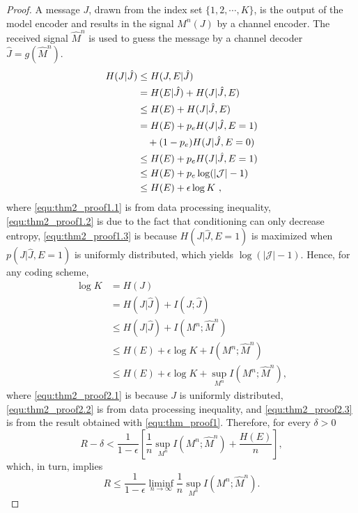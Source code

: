 \documentclass[lettersize,journal]{IEEEtran}
\theoremstyle{definition}
\theoremstyle{plain}
\begin{document}
\begin{proof}
    A message $J$, drawn from the index set $\{1,2,\cdots, K\}$, is the output of the model encoder and results in the signal $M^n(J)$ by a channel encoder. The received signal $\hat{M}^n$ is used to guess the message by a channel decoder $\hat{J}=g(\hat{M}^n)$.
    \begin{subequations}
        \label{equ:thm_proof1}
        \begin{align}
            H(J|\hat{J}) & \leq H(J, E | \hat{J}) \label{equ:thm2_proof1.1} \\
            & = H(E|\hat{J}) + H(J|\hat{J}, E) \\
            & \leq H(E) + H(J|\hat{J}, E) \label{equ:thm2_proof1.2} \\
            & = H(E) + p_eH(J|\hat{J}, E=1) \\
            & \notag \quad + (1-p_e)H(J|\hat{J}, E=0) \\
            & \leq H(E) + p_eH(J|\hat{J}, E=1) \\
            & \leq H(E) + p_e\log(|\mathcal{J}|-1) \label{equ:thm2_proof1.3} \\
            & \leq H(E) + \epsilon \log K\ ,
        \end{align}
    \end{subequations}
    where \cref{equ:thm2_proof1.1} is from data processing inequality, \cref{equ:thm2_proof1.2} is due to the fact that conditioning can only decrease entropy, \cref{equ:thm2_proof1.3} is because $H(J|\hat{J},E=1)$ is maximized when $p(J|\hat{J},E=1)$ is uniformly distributed, which yields $\log(\left|\mathcal{J}\right|-1)$. 
    Hence, for any coding scheme,
    \begin{subequations}
        \begin{align}
            \log K & = H(J) \label{equ:thm2_proof2.1} \\
            & = H(J|\hat{J}) + I(J;\hat{J}) \\
            & \leq H(J|\hat{J}) + I(M^n;\hat{M}^n) \label{equ:thm2_proof2.2} \\
            & \leq H(E) + \epsilon\log K + I(M^n;\hat{M}^n) \label{equ:thm2_proof2.3} \\
            & \leq H(E) + \epsilon\log K + \sup_{M^n}I(M^n;\hat{M}^n) \label{equ:thm2_proof2.4},
        \end{align}
    \end{subequations}
    where \cref{equ:thm2_proof2.1} is because $J$ is uniformly distributed, \cref{equ:thm2_proof2.2} is from data processing inequality, and \cref{equ:thm2_proof2.3} is from the result obtained with \cref{equ:thm_proof1}. 
    Therefore, for every $\delta>0$
    \begin{equation}
        R-\delta < \frac{1}{1-\epsilon}\left[\frac{1}{n}\sup_{M^n}I(M^n;\hat{M}^n) + \frac{H(E)}{n}\right],
    \end{equation}
    which, in turn, implies
    \begin{equation}
        R\leq \frac{1}{1-\epsilon} \liminf_{n\to\infty}\frac{1}{n}\sup_{M^n}I(M^n;\hat{M}^n).
    \end{equation}
\end{proof}
\end{document}
